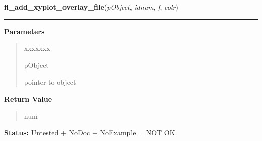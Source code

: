 \hspace{.8\funcindent}\begin{boxedminipage}{\funcwidth}

    \raggedright \textbf{fl\_add\_xyplot\_overlay\_file}(\textit{pObject}, \textit{idnum}, \textit{f}, \textit{colr})

    \vspace{-1.5ex}

    \rule{\textwidth}{0.5\fboxrule}
\setlength{\parskip}{2ex}
\setlength{\parskip}{1ex}
      \textbf{Parameters}
      \vspace{-1ex}

      \begin{quote}
        \begin{Ventry}{xxxxxxx}

          \item[pObject]

          pointer to object

        \end{Ventry}

      \end{quote}

      \textbf{Return Value}
    \vspace{-1ex}

      \begin{quote}
      num

      \end{quote}

\textbf{Status:} Untested + NoDoc + NoExample = NOT OK



    \end{boxedminipage}

    \label{xformslib:library:fl_set_xyplot_return}

    \vspace{0.5ex}

